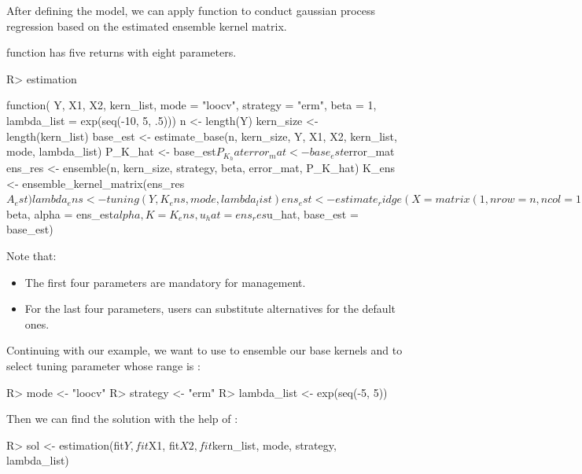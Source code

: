 \documentclass[article]{jss}
\begin{document}
After defining the model, we can apply  function to conduct gaussian process regression based on the estimated ensemble kernel matrix.

 function has five returns with eight parameters.
\begin{CodeChunk}
\begin{CodeInput}
R> estimation
\end{CodeInput}
\begin{CodeOutput}
function(
  Y, X1, X2, kern_list, mode = "loocv", strategy = "erm", 
  beta = 1, lambda_list = exp(seq(-10, 5, .5))) {
  n <- length(Y)
  kern_size <- length(kern_list)
  base_est <- estimate_base(n, kern_size, Y, X1, X2, kern_list, 
                            mode, lambda_list)
  P_K_hat <- base_est$P_K_hat
  error_mat <- base_est$error_mat
  ens_res <- ensemble(n, kern_size, strategy, beta, error_mat, P_K_hat)
  K_ens <- ensemble_kernel_matrix(ens_res$A_est)
  lambda_ens <- tuning(Y, K_ens, mode, lambda_list)
  ens_est <- estimate_ridge(X = matrix(1, nrow = n, ncol = 1),
                            K = K_ens, Y = Y, lambda = lambda_ens)
  list(lambda = lambda_ens, 
       beta = ens_est$beta, 
       alpha = ens_est$alpha, K = K_ens, 
       u_hat = ens_res$u_hat, base_est = base_est)
}
\end{CodeOutput}
\end{CodeChunk}

Note that:
\begin{itemize}
  \item The first four parameters are mandatory for management.
  \item For the last four parameters, users can substitute alternatives for the default ones.
\end{itemize}

Continuing with our example, we want to use  to ensemble our base kernels and  to select tuning parameter whose range is :
\begin{CodeChunk}
\begin{CodeInput}
R> mode <- "loocv"
R> strategy <- "erm"
R> lambda_list <- exp(seq(-5, 5))
\end{CodeInput}
\end{CodeChunk}

Then we can find the solution with the help of :
\begin{CodeChunk}
\begin{CodeInput}
R> sol <- estimation(fit$Y, fit$X1, fit$X2, fit$kern_list, mode, strategy, lambda_list)
\end{CodeInput}
\end{CodeChunk}
\end{document}
